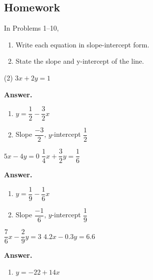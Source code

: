 \documentclass[10pt,]{book}
\theoremstyle{plain}
\theoremstyle{definition}
\theoremstyle{definition}
\theoremstyle{definition}
\theoremstyle{definition}
\numberwithin{equation}{part}
\begin{document}
\subsection[{Homework}]{Homework}\label{section-1-5-exercises}
\hypertarget{exercisegroup-36}{}\par\noindent In Problems 1–10, \leavevmode%
\begin{enumerate}[label=*\alph**]
\item\hypertarget{li-1147}{}Write each equation in slope-intercept form.%
\item\hypertarget{li-1148}{}State the slope and y-intercept of the line.%
\end{enumerate}
%
\begin{exercisegroup}(2)
\exercise[1.]\hypertarget{exercise-287}{}\(3x + 2y = 1\)%
\par\smallskip
\noindent\textbf{Answer.}\hypertarget{answer-164}{}\quad
\leavevmode%
\begin{multicols}{2}
\begin{enumerate}[label=*\alph**]
\item\hypertarget{li-1149}{}\(y = \dfrac{1}{2}- \dfrac{3}{2}x\)%
\item\hypertarget{li-1150}{}Slope \(\dfrac{-3}{2}\), \(y\)-intercept \(\dfrac{1}{2} \)%
\end{enumerate}
\end{multicols}
%
\exercise[2.]\hypertarget{exercise-288}{}\(5x - 4y = 0\)%
\exercise[3.]\hypertarget{exercise-289}{}\(\dfrac{1}{4}x + \dfrac{3}{2}y = \dfrac{1}{6}\)%
\par\smallskip
\noindent\textbf{Answer.}\hypertarget{answer-165}{}\quad
\leavevmode%
\begin{multicols}{2}
\begin{enumerate}[label=*\alph**]
\item\hypertarget{li-1151}{}\(y = \dfrac{1}{9}- \dfrac{1}{6}x\)%
\item\hypertarget{li-1152}{}Slope \(\dfrac{-1}{6}\), \(y\)-intercept \(\dfrac{1}{9} \)%
\end{enumerate}
\end{multicols}
%
\exercise[4.]\hypertarget{exercise-290}{}\(\dfrac{7}{6}x - \dfrac{2}{9}y = 3\)%
\exercise[5.]\hypertarget{exercise-291}{}\(4.2x - 0.3y = 6.6\)%
\par\smallskip
\noindent\textbf{Answer.}\hypertarget{answer-166}{}\quad
\leavevmode%
\begin{multicols}{2}
\begin{enumerate}[label=*\alph**]
\item\hypertarget{li-1153}{}\(y = -22 + 14x\)%

\end{enumerate}
\end{multicols}
\end{exercisegroup}
\end{document}
